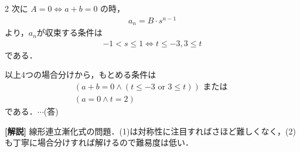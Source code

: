\documentclass[../../main.tex]{subfiles}
\begin{document}
\begin{multicols}{2}
  次に $A=0 \iff a+b=0$ の時，
  \begin{align}
    a_n = B \cdot s^{n-1}
  \end{align}
  より，$a_n$が収束する条件は
  \begin{align}
    -1 < s \le 1 \iff t \le -3, 3 \le t
  \end{align}
  である．

  以上4つの場合分けから，もとめる条件は
  \begin{align}
    (a+b=0 \land (t \le -3 \text{ or } 3 \le t)) \text{ または } \\
    (a=0 \land t = 2)
  \end{align}
  である．$\cdots$(答)

  {\bf [解説]}
  線形連立漸化式の問題．(1)は対称性に注目すればさほど難しくなく，(2)も丁寧に場合分けすれば解けるので難易度は低い．


\end{multicols}
\end{document}
